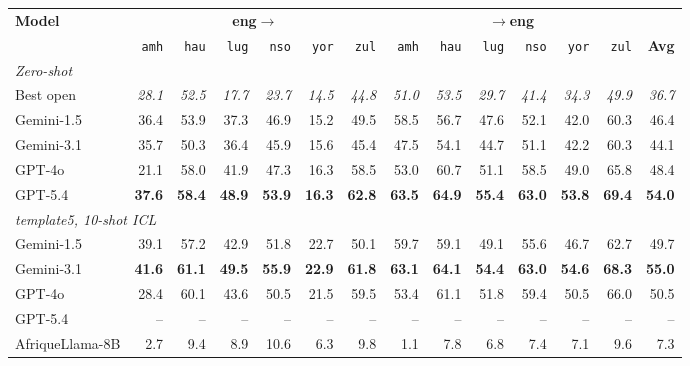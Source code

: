 \begin{table}[t]
\centering
\small
\renewcommand{\arraystretch}{1.05}
\begin{tabular}{lrrrrrrrrrrrrr}
\toprule
\textbf{Model} & \multicolumn{6}{c}{\textbf{eng$\to$}} & \multicolumn{6}{c}{\textbf{$\to$eng}} & \\
\cmidrule(lr){2-7}\cmidrule(lr){8-13}
   & \texttt{amh} & \texttt{hau} & \texttt{lug} & \texttt{nso} & \texttt{yor} & \texttt{zul} & \texttt{amh} & \texttt{hau} & \texttt{lug} & \texttt{nso} & \texttt{yor} & \texttt{zul} & \textbf{Avg} \\
\midrule
\multicolumn{14}{l}{\textit{Zero-shot}} \\
\midrule
Best open & \emph{28.1} & \emph{52.5} & \emph{17.7} & \emph{23.7} & \emph{14.5} & \emph{44.8} & \emph{51.0} & \emph{53.5} & \emph{29.7} & \emph{41.4} & \emph{34.3} & \emph{49.9} & \emph{36.7} \\
\midrule
Gemini-1.5 & 36.4 & 53.9 & 37.3 & 46.9 & 15.2 & 49.5 & 58.5 & 56.7 & 47.6 & 52.1 & 42.0 & 60.3 & 46.4 \\
Gemini-3.1 & 35.7 & 50.3 & 36.4 & 45.9 & 15.6 & 45.4 & 47.5 & 54.1 & 44.7 & 51.1 & 42.2 & 60.3 & 44.1 \\
GPT-4o & 21.1 & 58.0 & 41.9 & 47.3 & 16.3 & 58.5 & 53.0 & 60.7 & 51.1 & 58.5 & 49.0 & 65.8 & 48.4 \\
GPT-5.4 & \textbf{37.6} & \textbf{58.4} & \textbf{48.9} & \textbf{53.9} & \textbf{16.3} & \textbf{62.8} & \textbf{63.5} & \textbf{64.9} & \textbf{55.4} & \textbf{63.0} & \textbf{53.8} & \textbf{69.4} & \textbf{54.0} \\
\midrule\midrule
\multicolumn{14}{l}{\textit{template5, 10-shot ICL}} \\
\midrule
Gemini-1.5 & 39.1 & 57.2 & 42.9 & 51.8 & 22.7 & 50.1 & 59.7 & 59.1 & 49.1 & 55.6 & 46.7 & 62.7 & 49.7 \\
Gemini-3.1 & \textbf{41.6} & \textbf{61.1} & \textbf{49.5} & \textbf{55.9} & \textbf{22.9} & \textbf{61.8} & \textbf{63.1} & \textbf{64.1} & \textbf{54.4} & \textbf{63.0} & \textbf{54.6} & \textbf{68.3} & \textbf{55.0} \\
GPT-4o & 28.4 & 60.1 & 43.6 & 50.5 & 21.5 & 59.5 & 53.4 & 61.1 & 51.8 & 59.4 & 50.5 & 66.0 & 50.5 \\
GPT-5.4 & -- & -- & -- & -- & -- & -- & -- & -- & -- & -- & -- & -- & -- \\
\midrule
AfriqueLlama-8B & 2.7 & 9.4 & 8.9 & 10.6 & 6.3 & 9.8 & 1.1 & 7.8 & 6.8 & 7.4 & 7.1 & 9.6 & 7.3 \\

\end{tabular}
\end{table}
